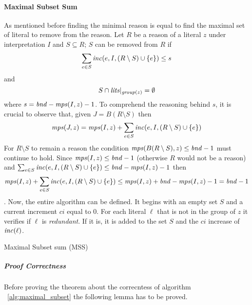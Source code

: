 \paragraph{Maximal Subset Sum}
As mentioned before finding the minimal reason is 
equal to find the maximal set of literal to remove from the reason.
Let $R$ be a reason of a literal $z$ under interpretation $I$ and
$S \subseteq R$;
$S$ can be removed from $R$ if 
$$\sum_{e \in S}\mathit{inc}(e,I,(R\setminus S) \cup \{e\}) \le s $$
and 
$$S \cap \mathit{lits}|_{\mathit{group}(z)} = \emptyset$$
where $s = \mathit{bnd} - \mathit{mps}(I,z) - 1$.
To comprehend the reasoning behind $s$, it is crucial to observe that, 
given $J = B(R\setminus S)$ 
then $$\mathit{mps}(J,z) = \mathit{mps}(I,z) + \sum_{e \in S}\mathit{inc}(e,I,(R\setminus S) \cup \{e\})$$
For $R\setminus S$ to remain a reason
the condition $\mathit{mps}(B(R\setminus S),z) \le \mathit{bnd} - 1$
must continue to hold.
Since $\mathit{mps}(I,z) \le \mathit{bnd} - 1 $ (otherwise $R$ would not be a reason)
and $\sum_{e \in S}\mathit{inc}(e,I,(R\setminus S) \cup \{e\}) \le \mathit{bnd} - \mathit{mps}(I,z) - 1$
then $$\mathit{mps}(I,z) + 
\sum_{e \in S}\mathit{inc}(e,I,(R\setminus S) \cup \{e\}) \le \mathit{mps}(I,z) + 
\mathit{bnd} - \mathit{mps}(I,z) - 1 = \mathit{bnd} - 1$$.
Now, the entire algorithm can be defined. 
It begins with an empty set $S$ and a current increment $ci$
equal to 0. For each literal $\ell$ that is not in the group 
of $z$ it verifies if $\ell$ is \textit{redundant}.
If it is, it is added to the set $S$ and the $ci$
increase of $\mathit{inc}(\ell)$. 
\begin{algorithm}[h]\small
    \caption{Maximal Subset sum (MSS)}
    \label{alg:maximal_subset}
\end{algorithm}

\subparagraph{Proof Correctness}

Before proving the theorem about the correcntess of algorithm ~\ref{alg:maximal_subset}
the following lemma has to be proved.


